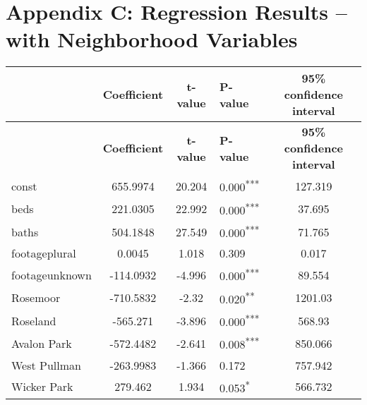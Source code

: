 \documentclass[12pt]{report}
\begin{document}
\section*{Appendix C: Regression Results -- with Neighborhood Variables}

\begin{longtable}{l S[table-format=6.4] S[table-format=3.4] l S[table-format=4.4]}
	\hline \hline
	                             & \textbf{Coefficient} & \textbf{t-value} & \textbf{P-value}           & \textbf{95\% confidence interval} \\ \hline
	\endfirsthead
	\hline \hline
	                             & \textbf{Coefficient} & \textbf{t-value} & \textbf{P-value}           & \textbf{95\% confidence interval} \\ \hline
	\endhead
	const                        & 655.9974             & 20.204           & 0.000\textsuperscript{***} & 127.319                           \\
	beds                         & 221.0305             & 22.992           & 0.000\textsuperscript{***} & 37.695                            \\
	baths                        & 504.1848             & 27.549           & 0.000\textsuperscript{***} & 71.765                            \\
	footageplural                & 0.0045               & 1.018            & 0.309                      & 0.017                             \\
	footageunknown               & -114.0932            & -4.996           & 0.000\textsuperscript{***} & 89.554                            \\
	Rosemoor                     & -710.5832            & -2.32            & 0.020\textsuperscript{**}  & 1201.03                           \\
	Roseland                     & -565.271             & -3.896           & 0.000\textsuperscript{***} & 568.93                            \\
	Avalon Park                  & -572.4482            & -2.641           & 0.008\textsuperscript{***} & 850.066                           \\
	West Pullman                 & -263.9983            & -1.366           & 0.172                      & 757.942                           \\
	Wicker Park                  & 279.462              & 1.934            & 0.053\textsuperscript{*}   & 566.732                           \\

\end{longtable}
\end{document}
